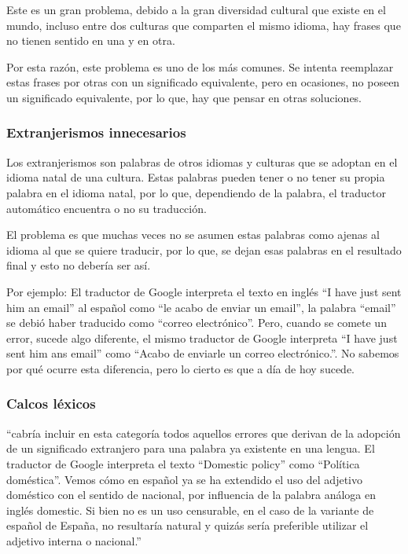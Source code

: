 \documentclass[conference]{IEEEtran}
\begin{document}
Este es un gran problema, debido a la gran diversidad cultural que existe en el mundo, incluso entre dos culturas que comparten el mismo idioma, hay frases que no tienen sentido en una y en otra.

Por esta razón, este problema es uno de los más comunes. Se intenta reemplazar estas frases por otras con un significado equivalente, pero en ocasiones, no poseen un significado equivalente, por lo que, hay que pensar en otras soluciones.

\subsubsection{Extranjerismos innecesarios}
Los extranjerismos son palabras de otros idiomas y culturas que se adoptan en el idioma natal de una cultura. Estas palabras pueden tener o no tener su propia palabra en el idioma natal, por lo que, dependiendo de la palabra, el traductor automático encuentra o no su traducción.

El problema es que muchas veces no se asumen estas palabras como ajenas al idioma al que se quiere traducir, por lo que, se dejan esas palabras en el resultado final y esto no debería ser así.

	Por ejemplo: El traductor de Google interpreta el texto en inglés “I have just sent him an email” al español como “le acabo de enviar un email”, la palabra “email” se debió haber traducido como “correo electrónico”. Pero, cuando se comete un error, sucede algo diferente, el mismo traductor de Google interpreta “I have just sent him ans email” como  “Acabo de enviarle un correo electrónico.”. No sabemos por qué ocurre esta diferencia, pero lo cierto es que a día de hoy sucede.

\subsubsection{Calcos léxicos}
“cabría incluir en esta categoría todos aquellos errores que derivan de la adopción de un significado extranjero para una palabra ya existente en una lengua. El traductor de Google interpreta el texto “Domestic policy” como “Política doméstica”. Vemos cómo en español ya se ha extendido el uso del adjetivo doméstico con el sentido de nacional, por influencia de la palabra análoga en inglés domestic. Si bien no es un uso censurable, en el caso de la variante de español de España, no resultaría natural y quizás sería preferible utilizar el adjetivo interna o nacional.”\cite{b9}
\end{document}
